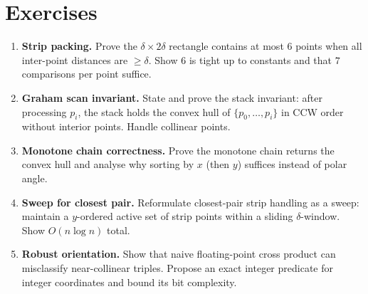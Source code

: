 \section{Exercises}
\label{sec:ch07-exercises}
\begin{enumerate}[label=E7.\arabic*, leftmargin=*, itemsep=0.7em]
    \item \textbf{Strip packing.} Prove the $\delta\times2\delta$ rectangle contains at most $6$ points when all inter-point distances are $\ge\delta$. Show $6$ is tight up to constants and that $7$ comparisons per point suffice.
    \item \textbf{Graham scan invariant.} State and prove the stack invariant: after processing $p_i$, the stack holds the convex hull of $\{p_0,\dots,p_i\}$ in CCW order without interior points. Handle collinear points.
    \item \textbf{Monotone chain correctness.} Prove the monotone chain returns the convex hull and analyse why sorting by $x$ (then $y$) suffices instead of polar angle.
    \item \textbf{Sweep for closest pair.} Reformulate closest-pair strip handling as a sweep: maintain a $y$-ordered active set of strip points within a sliding $\delta$-window. Show $O(n\log n)$ total.
    \item \textbf{Robust orientation.} Show that naive floating-point cross product can misclassify near-collinear triples. Propose an exact integer predicate for integer coordinates and bound its bit complexity.
\end{enumerate}
